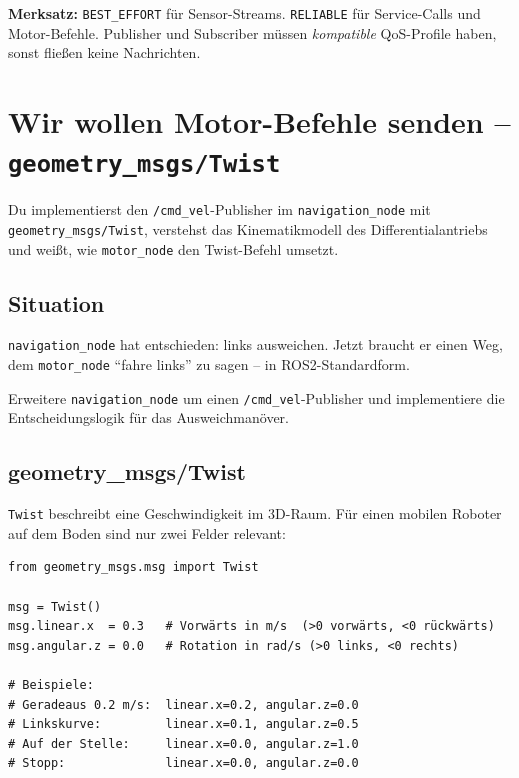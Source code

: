 \begin{merksatzBox}
\textbf{Merksatz:}
\texttt{BEST\_EFFORT} für Sensor-Streams.
\texttt{RELIABLE} für Service-Calls und Motor-Befehle.
Publisher und Subscriber müssen \emph{kompatible} QoS-Profile haben,
sonst fließen keine Nachrichten.
\end{merksatzBox}


\chapter{Wir wollen Motor-Befehle senden – \texttt{geometry\_msgs/Twist}}

\begin{lernziele}
Du implementierst den \texttt{/cmd\_vel}-Publisher im \texttt{navigation\_node}
mit \texttt{geometry\_msgs/Twist}, verstehst das Kinematikmodell
des Differentialantriebs und weißt,
wie \texttt{motor\_node} den Twist-Befehl umsetzt.
\end{lernziele}

\section{Situation}

\texttt{navigation\_node} hat entschieden: links ausweichen.
Jetzt braucht er einen Weg, dem \texttt{motor\_node}
"`fahre links"' zu sagen -- in ROS2-Standardform.

\begin{aufgabeBox}
Erweitere \texttt{navigation\_node} um einen \texttt{/cmd\_vel}-Publisher
und implementiere die Entscheidungslogik für das Ausweichmanöver.
\end{aufgabeBox}

\section{geometry\_msgs/Twist}

\begin{wissenBox}
\texttt{Twist} beschreibt eine Geschwindigkeit im 3D-Raum.
Für einen mobilen Roboter auf dem Boden sind nur zwei Felder relevant:

\begin{lstlisting}
from geometry_msgs.msg import Twist

msg = Twist()
msg.linear.x  = 0.3   # Vorwärts in m/s  (>0 vorwärts, <0 rückwärts)
msg.angular.z = 0.0   # Rotation in rad/s (>0 links, <0 rechts)

# Beispiele:
# Geradeaus 0.2 m/s:  linear.x=0.2, angular.z=0.0
# Linkskurve:         linear.x=0.1, angular.z=0.5
# Auf der Stelle:     linear.x=0.0, angular.z=1.0
# Stopp:              linear.x=0.0, angular.z=0.0
\end{lstlisting}
\end{wissenBox}

